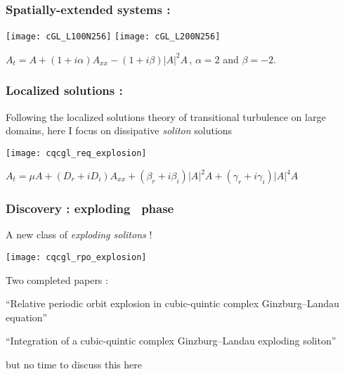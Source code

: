 \begin{frame}[shrink]%
  \frametitle{Spatially-extended systems : \cGL}

  \begin{center}
    \texttt{[image: cGL\_L100N256]}
    \texttt{[image: cGL\_L200N256]}

    {
      $A_t = A + (1 + i\alpha)A_{xx} - (1 +i\beta)|A|^2A$\,,\;
      $\alpha=2$ and $\beta=-2$.
    }
  \end{center}

  \vfill
\end{frame}

\begin{frame}%
  \frametitle{\small Localized solutions : \cqcGLe}
  {\small
    Following the localized solutions theory of transitional turbulence
    on large domains, here
    I focus on dissipative \emph{\color{blue} soliton} solutions
  }

  {\centering
    \texttt{[image: cqcgl\_req\_explosion]}

    $A_t = \mu A + (D_r + iD_i)A_{xx} + (\beta_r + i\beta_i)|A|^2A
    + (\gamma_r + i\gamma_i)|A|^4A
    $
  \par}

\end{frame}

\begin{frame}[shrink]
  \frametitle{Discovery : exploding \rpo\ phase}
  {\small
    A new class of \emph{\color{blue} exploding solitons} !
  }
  {\centering
    \texttt{[image: cqcgl\_rpo\_explosion]}
    \par}
  Two completed papers :
  \begin{block}{}
    \textrm{
      \small
      ``Relative periodic orbit explosion in cubic-quintic complex
      {Ginzburg--Landau} equation''
    }
  \end{block}
  \begin{block}{}
    \textrm{
      \small
      ``Integration of a cubic-quintic complex {Ginzburg--Landau} exploding
      soliton''
    }
  \end{block}
  but no time to discuss this here

\end{frame}
